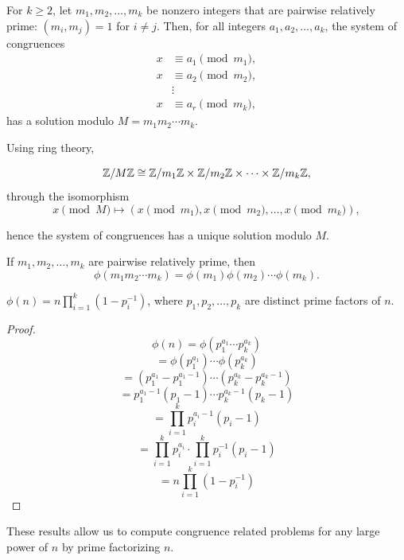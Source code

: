 \begin{theorem}
    For $k \geq 2$, let $m_1, m_2, \dots, m_k$ be nonzero integers that are pairwise relatively prime: 
$(m_i, m_j) = 1$ for $i \neq j$. Then, for all integers $a_1, a_2, \dots, a_k$, the system of congruences
\begin{align*}
    x &\equiv a_1 \pmod{m_1}, \\
    x &\equiv a_2 \pmod{m_2}, \\
    &\vdots \\
    x &\equiv a_r \pmod{m_k},
\end{align*}
has a solution modulo $M = m_1 m_2 \cdots m_k$.
\end{theorem}
\begin{replacementproof}[Rough]
    Using ring theory,

    \[\mathbb{Z}/M\mathbb{Z} \cong \mathbb{Z}/m_1\mathbb{Z} \times \mathbb{Z}/m_2\mathbb{Z} \times \cdots \times \mathbb{Z}/m_k\mathbb{Z},\] through the isomorphism \[x \pmod{M} \mapsto (x \pmod{m_1}, x \pmod{m_2}, \dots, x \pmod{m_k}),\]

    hence the system of congruences has a unique solution modulo $M$.
\end{replacementproof}

\begin{corollary}
    If $m_1, m_2, \dots, m_k$ are pairwise relatively prime, then \[\phi(m_1 m_2 \cdots m_k) = \phi(m_1) \phi(m_2) \cdots \phi(m_k).\]
\end{corollary}

\begin{corollary}\label{cor:phi_form}
    $\phi(n) = n \prod_{i=1}^{k} (1 - p_i^{-1})$, where $p_1, p_2, \dots, p_k$ are distinct prime factors of $n$.
\end{corollary}
\begin{proof}
    \[
    \phi(n) = \phi \left( p_1^{a_1} \cdots p_k^{a_k} \right)
    \]
    \[
    = \phi(p_1^{a_1}) \cdots \phi(p_k^{a_k})
    \]
    \[
    = (p_1^{a_1} - p_1^{a_1-1}) \cdots (p_k^{a_k} - p_k^{a_k-1})
    \]
    \[
    = p_1^{a_1 - 1} (p_1 - 1) \cdots p_k^{a_k - 1} (p_k - 1)
    \]
    \[
    = \prod_{i=1}^{k} p_i^{a_i - 1} (p_i - 1)
    \]
    \[
    = \prod_{i=1}^{k} p_i^{a_i} \cdot \prod_{i=1}^{k} p_i^{-1} (p_i - 1)
    \]
    \[
    = n \prod_{i=1}^{k} (1 - p_i^{-1})
    \]
\end{proof}

These results allow us to compute congruence related problems for any large power of $n$ by prime factorizing $n$.

